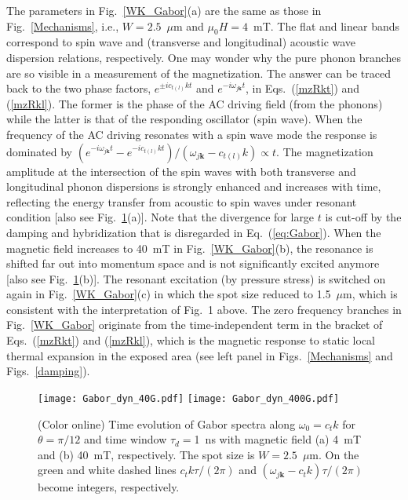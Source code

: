 \documentclass[aps,prb,twocolumn,superscriptaddress,floatfix]{revtex4}%
\begin{document}
The parameters in Fig.~\ref{WK_Gabor}(a) are the same as those in Fig.~\ref{Mechanisms}, i.e., $W=2.5$~$\mu$m and $\mu_0 H=4$~mT. The flat and linear bands correspond to spin wave and (transverse and longitudinal) acoustic wave dispersion relations, respectively. One may wonder why the pure phonon branches are so visible in a measurement of the magnetization. The answer can be traced back to the two phase factors, $e^{\pm ic_{t(l)}kt}$ and $e^{-i\omega_{j\mathbf{k}}t}$, in Eqs.~(\ref{mzRkt}) and (\ref{mzRkl}). The former is the phase of the AC driving field (from the phonons) while the latter is that of the responding oscillator (spin wave). When the frequency of the AC driving resonates with a spin wave mode the response is dominated by $(e^{-i\omega_{j\mathbf{k}}t}-e^{-i c_{t(l)}kt})/{(\omega_{j\mathbf{k}}-c_{t(l)}k)}\propto t$. The magnetization amplitude at the intersection of the spin waves with both transverse and longitudinal phonon dispersions is strongly enhanced and increases with time, reflecting the energy transfer from acoustic to spin waves under resonant condition [also see Fig.~\ref{KT_Gabor}(a)].
 Note that the divergence for large $t$ is cut-off by the damping and hybridization that is disregarded in Eq.~(\ref{eq:Gabor}). When the magnetic field increases to 40~mT in Fig.~\ref{WK_Gabor}(b), the resonance is shifted far out into momentum space and is not significantly excited anymore [also see Fig.~\ref{KT_Gabor}(b)]. 
The resonant excitation (by pressure stress) is switched on again in Fig.~\ref{WK_Gabor}(c) in which the spot size reduced to 1.5~$\mu$m, which is consistent with the interpretation of Fig.~1 above. The zero frequency branches in Fig.~\ref{WK_Gabor} originate from the time-independent term in the bracket of Eqs.~(\ref{mzRkt}) and (\ref{mzRkl}), which is the magnetic response to static local thermal expansion in the exposed area (see left panel in Figs.~\ref{Mechanisms} and Figs.~\ref{damping}).


\begin{figure}[ptb]
\texttt{[image: Gabor\_dyn\_40G.pdf]}
\texttt{[image: Gabor\_dyn\_400G.pdf]}
\caption{(Color online) Time evolution of Gabor spectra along $\omega_0=c_t k$ for $\theta=\pi/12$ and time window $\tau_d=$1~ns with magnetic field (a) 4~mT and (b) 40~mT, respectively. The spot size is $W=2.5$~$\mu$m.
On the green and white dashed lines $c_t k\tau/(2\pi)$ and $(\omega_{j\mathbf k}-c_t k )\tau/(2\pi)$ become integers, respectively.}%
\label{KT_Gabor}%
\end{figure}
\end{document}

